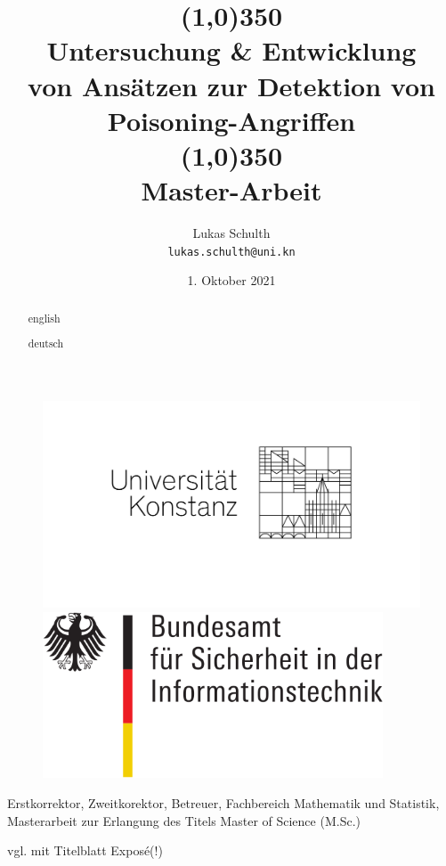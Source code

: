 \documentclass[twoside, 12pt,a4paper]{article}
\title{\line(1,0){350}\\Untersuchung \& Entwicklung \\von Ansätzen zur Detektion von Poisoning-Angriffen\\\line(1,0){350}\\
	Master-Arbeit}
\author{
	Lukas Schulth\\
	\texttt{lukas.schulth@uni.kn}
}
\date{1. Oktober 2021}
\numberwithin{equation}{section}
\begin{document}
	\begin{titlepage}
		
		
		
		\thispagestyle{empty} 
		\begin{figure}
			\centering
			\begin{minipage}{0.45\textwidth}
				\centering
				\includegraphics[width=1.2\textwidth]{logounikn} %
				
			\end{minipage}\hfill
			\begin{minipage}{0.45\textwidth}
				\centering
				\includegraphics[width=0.9\textwidth]{bsi_logo} %
			
			\end{minipage}
		\end{figure}
	\maketitle
	
	Erstkorrektor, Zweitkorektor, Betreuer, Fachbereich Mathematik und Statistik, Masterarbeit zur Erlangung des Titels Master of Science (M.Sc.)
	
	vgl. mit Titelblatt Exposé(!)
	
	\end{titlepage}
	\begin{abstract}english\end{abstract}
	\begin{abstract}deutsch\end{abstract}
\end{document}
